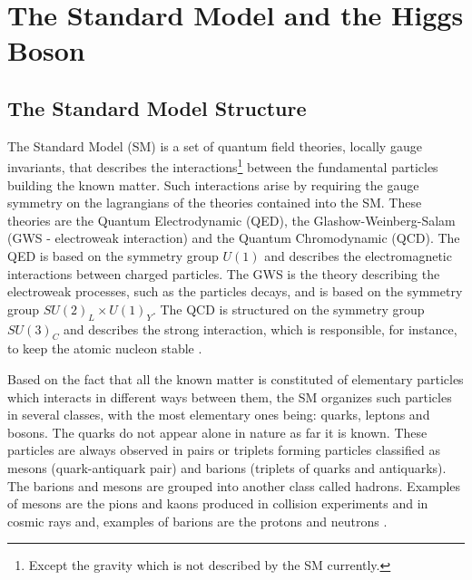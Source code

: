 \chapter{The Standard Model and the Higgs Boson}

\section{The Standard Model Structure}
The Standard Model (SM) is a set of quantum field theories, locally gauge invariants, that describes the interactions\footnote{Except the gravity which is not described by the SM currently.} between the fundamental particles building the known matter. Such interactions arise by requiring the gauge symmetry on the lagrangians of the theories contained into the SM. These theories are the Quantum Electrodynamic (QED), the Glashow-Weinberg-Salam (GWS - electroweak interaction) and the Quantum Chromodynamic (QCD). The QED is based on the symmetry group $U(1)$ and describes the electromagnetic interactions between charged particles. The GWS is the theory describing the electroweak processes, such as the particles decays, and is based on the symmetry group $SU(2)_L \times U(1)_Y$. The QCD is structured on the symmetry group $SU(3)_C$ and describes the strong interaction, which is responsible, for instance, to keep the atomic nucleon stable \cite{bib:whitbeck-2013, bib:brachem-2012}.

Based on the fact that all the known matter is constituted of elementary particles which interacts in different ways between them, the SM organizes such particles in several classes, with the most elementary ones being: quarks, leptons and bosons. The quarks do not appear alone in nature as far it is known. These particles are always observed in pairs or triplets forming particles classified as mesons (quark-antiquark pair) and barions (triplets of quarks and antiquarks). The barions and mesons are grouped into another class called hadrons. Examples of mesons are the pions and kaons produced in collision experiments and in cosmic rays and, examples of barions are the protons and neutrons \cite{bib:griffiths-2008,bib:halzen-martin-1984}.

